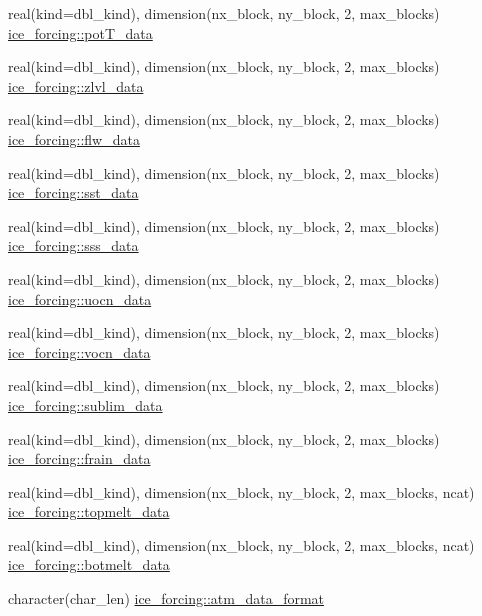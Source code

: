 \begin{DoxyCompactItemize}
\item 
real(kind=dbl\_\-kind), dimension(nx\_\-block, ny\_\-block, 2, max\_\-blocks) \hyperlink{namespaceice__forcing_a8be75ef0261c9c45a8a2b4983813d2ea}{ice\_\-forcing::potT\_\-data}
\item 
real(kind=dbl\_\-kind), dimension(nx\_\-block, ny\_\-block, 2, max\_\-blocks) \hyperlink{namespaceice__forcing_ad17a564b4d1aff388f9e96432340e0f8}{ice\_\-forcing::zlvl\_\-data}
\item 
real(kind=dbl\_\-kind), dimension(nx\_\-block, ny\_\-block, 2, max\_\-blocks) \hyperlink{namespaceice__forcing_a22c2a2d054007cbf4c83142fba90a332}{ice\_\-forcing::flw\_\-data}
\item 
real(kind=dbl\_\-kind), dimension(nx\_\-block, ny\_\-block, 2, max\_\-blocks) \hyperlink{namespaceice__forcing_ab6d2ed507a72720751a324430fb30e40}{ice\_\-forcing::sst\_\-data}
\item 
real(kind=dbl\_\-kind), dimension(nx\_\-block, ny\_\-block, 2, max\_\-blocks) \hyperlink{namespaceice__forcing_afc0212ff56f8450191bde0697eec98c0}{ice\_\-forcing::sss\_\-data}
\item 
real(kind=dbl\_\-kind), dimension(nx\_\-block, ny\_\-block, 2, max\_\-blocks) \hyperlink{namespaceice__forcing_abf31afbe922f5e349590ae3e542e2116}{ice\_\-forcing::uocn\_\-data}
\item 
real(kind=dbl\_\-kind), dimension(nx\_\-block, ny\_\-block, 2, max\_\-blocks) \hyperlink{namespaceice__forcing_af9f5d7d98f0d9a7a1754c8e066a5ecc7}{ice\_\-forcing::vocn\_\-data}
\item 
real(kind=dbl\_\-kind), dimension(nx\_\-block, ny\_\-block, 2, max\_\-blocks) \hyperlink{namespaceice__forcing_aeefce6613d18c1281edaf501aa11ce4a}{ice\_\-forcing::sublim\_\-data}
\item 
real(kind=dbl\_\-kind), dimension(nx\_\-block, ny\_\-block, 2, max\_\-blocks) \hyperlink{namespaceice__forcing_a33507a33e635005acfc8ac3fcb8f330d}{ice\_\-forcing::frain\_\-data}
\item 
real(kind=dbl\_\-kind), dimension(nx\_\-block, ny\_\-block, 2, max\_\-blocks, ncat) \hyperlink{namespaceice__forcing_a76dd37d14a04398b8cddb3930e86f682}{ice\_\-forcing::topmelt\_\-data}
\item 
real(kind=dbl\_\-kind), dimension(nx\_\-block, ny\_\-block, 2, max\_\-blocks, ncat) \hyperlink{namespaceice__forcing_a3f2b5aab55a596bdea86fc066fb03fc9}{ice\_\-forcing::botmelt\_\-data}
\item 
character(char\_\-len) \hyperlink{namespaceice__forcing_a47d5ef141d5d07f3facede3ccda065b9}{ice\_\-forcing::atm\_\-data\_\-format}

\end{DoxyCompactItemize}
